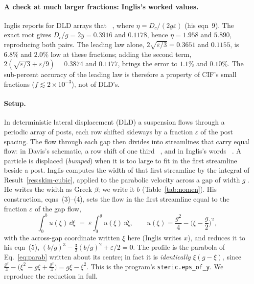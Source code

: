 \paragraph{A check at much larger fractions: Inglis's worked values.} Inglis reports for DLD
arrays that
~\cite[p.~656]{b17},
where $\eta=D_c/(2g\varepsilon)$ (his eqn~9). The exact root gives $D_c/g=2y=0.3916$ and
$0.1178$, hence $\eta=1.958$ and $5.890$, reproducing both pairs. The leading law alone,
$2\sqrt{\varepsilon/3}=0.3651$ and $0.1155$, is $6.8\%$ and $2.0\%$ low at these fractions;
adding the second term, $2(\sqrt{\varepsilon/3}+\varepsilon/9)=0.3874$ and $0.1177$, brings the
error to $1.1\%$ and $0.10\%$. The sub-percent accuracy of the leading law is therefore a
property of CIF's small fractions ($f\lesssim2\times10^{-3}$), not of DLD's.

\label{res:dld-cubic}

\paragraph{Setup.} In deterministic lateral displacement (DLD) a suspension flows through a
periodic array of posts, each row shifted sideways by a fraction $\varepsilon$ of the post
spacing. The flow through each gap then divides into streamlines that carry equal flow: in
Davis's schematic, a row shift of one third ~\cite[p.~14780]{bdavis06},
and in Inglis's words ~\cite[p.~656]{b17}.
A particle is displaced (\emph{bumped}) when it is too large to fit in the first streamline beside
a post. Inglis computes the width of that first streamline by the integral of
Result~\ref{res:skim-cubic}, applied to the parabolic velocity across a gap of width $g$
\cite{b17}. He writes the width as Greek $\beta$; we write it $b$ (Table~\ref{tab:nomen}).
His construction, eqns~(3)--(4), sets the flow in the first streamline equal to the fraction
$\varepsilon$ of the gap flow,
\begin{equation}
\int_0^{b} u(\xi)\,\dd\xi \;=\; \varepsilon\int_0^{g} u(\xi)\,\dd\xi,
\qquad
u(\xi) = \frac{g^2}{4} - \Big(\xi - \frac{g}{2}\Big)^2,
\label{eq:inglis}
\end{equation}
with the across-gap coordinate written $\xi$ here (Inglis writes $x$), and reduces it to his
eqn~(5), $(b/g)^3 - \tfrac32 (b/g)^2 + \varepsilon/2 = 0$. The profile is the parabola of
Eq.~\eqref{eq:parab} written about its centre; in fact it is \emph{identically}
$\xi(g-\xi)$, since $\tfrac{g^2}{4}-\big(\xi^2-g\xi+\tfrac{g^2}{4}\big)=g\xi-\xi^2$. This is the
program's \texttt{steric.eps\_of\_y}. We reproduce the reduction in full.

